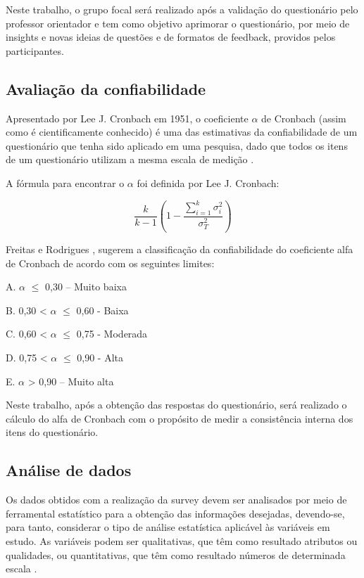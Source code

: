 Neste trabalho, o grupo focal será realizado após a validação do questionário pelo professor orientador e tem como objetivo aprimorar o questionário, por meio de insights e novas ideias de questões e de formatos de feedback, providos pelos participantes.

\subsection{Avaliação da confiabilidade}

Apresentado por Lee J. Cronbach em 1951, o coeficiente $\alpha$ de Cronbach (assim como é cientificamente conhecido) é uma das estimativas da confiabilidade de um questionário que tenha sido aplicado em uma pesquisa, dado que todos os itens de um questionário utilizam a mesma escala de medição \cite{freitas2005avaliaccao}.

A fórmula para encontrar o $\alpha$ foi definida por Lee J. Cronbach:

\begin{equation}
\frac{k}{k-1} \left(1 - \frac{\sum_{i=1}^{k} \sigma_{i}^2}{\sigma_{T}^2}\right)
\end{equation}

Freitas e Rodrigues \cite{freitas2005avaliaccao}, sugerem a classificação da confiabilidade do coeficiente alfa de Cronbach de acordo com os seguintes limites:

A. $\alpha$ $\leq$ 0,30 – Muito baixa

B. 0,30 < $\alpha$ $\leq$ 0,60 - Baixa

C. 0,60 < $\alpha$ $\leq$ 0,75 - Moderada

D. 0,75 < $\alpha$ $\leq$ 0,90 - Alta

E. $\alpha$ > 0,90 – Muito alta

Neste trabalho, após a obtenção das respostas do questionário, será realizado o cálculo do alfa de Cronbach com o propósito de medir a consistência interna dos itens do questionário.

\subsection{Análise de dados}

Os dados obtidos com a realização da survey devem ser analisados por meio de ferramental estatístico para a obtenção das informações desejadas, devendo-se, para tanto, considerar o tipo de análise estatística aplicável às variáveis em estudo. As variáveis podem ser qualitativas, que têm como resultado atributos ou qualidades, ou quantitativas, que têm como resultado números de determinada escala \cite{freitas2000metodo}.

